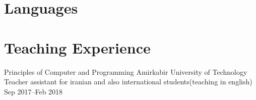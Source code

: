\documentclass[11pt, a4paper, color, final]{moderncv}
\begin{document}


\section{Languages}


\section{Teaching Experience}

\cventry{}
  {Principles of Computer and Programming}
  {}
  {Amirkabir University of Technology}
  {Teacher assistant for iranian and also international students(teaching in english)}
  {Sep 2017--Feb 2018}
\end{document}
